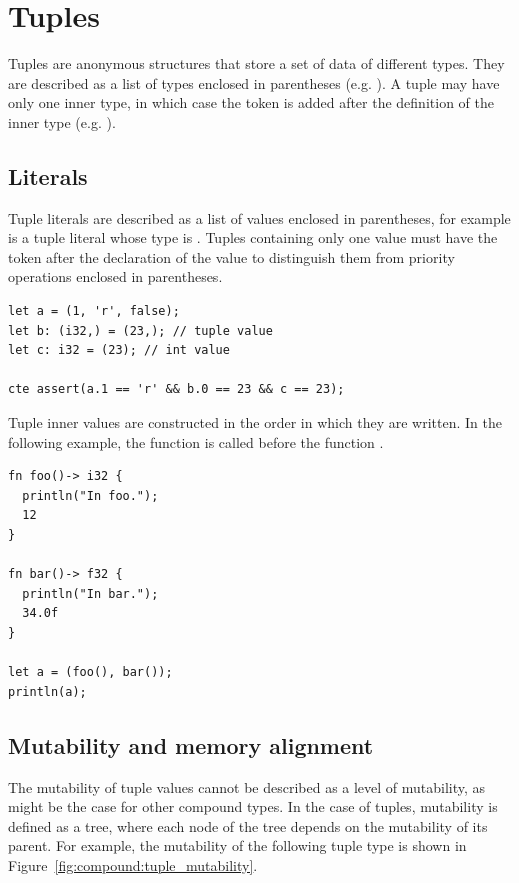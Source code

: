 \section{Tuples}
\label{sec:compound:tuples}

Tuples are anonymous structures that store a set of data of different types.
They are described as a list of types enclosed in parentheses (e.g.
). A tuple may have only one inner type, in which case
the token \token{,} is added after the definition of the inner type (e.g.
).

\subsection{Literals}

Tuple literals are described as a list of values enclosed in parentheses, for
example  is a tuple literal whose type is . Tuples containing only one value must have the token \token{,}
after the declaration of the value to distinguish them from priority operations
enclosed in parentheses.

\begin{lstlisting}[style=coloredverbatim]
let a = (1, 'r', false);
let b: (i32,) = (23,); // tuple value
let c: i32 = (23); // int value

cte assert(a.1 == 'r' && b.0 == 23 && c == 23);
\end{lstlisting}

\noindent Tuple inner values are constructed in the order in which they are
written. In the following example, the function  is called before
the function .

\begin{lstlisting}[style=coloredverbatim]
fn foo()-> i32 {
  println("In foo.");
  12
}

fn bar()-> f32 {
  println("In bar.");
  34.0f
}

let a = (foo(), bar());
println(a);
\end{lstlisting}

\subsection{Mutability and memory alignment}%
\label{sec:compound:tuple_mutability}

The mutability of tuple values cannot be described as a level of mutability, as
might be the case for other compound types. In the case of tuples, mutability is
defined as a tree, where each node of the tree depends on the mutability of its
parent. For example, the mutability of the following tuple type  is shown in Figure~\ref{fig:compound:tuple_mutability}.

